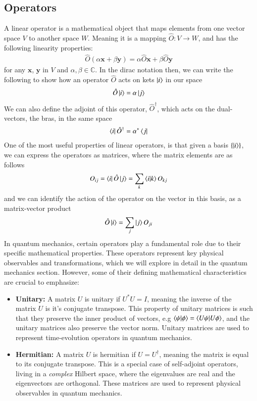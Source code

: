 \documentclass{subfiles}
\begin{document}
\subsection*{Operators}
A linear operator is a mathematical object that maps elements from one vector space $V$ to another space $W$. Meaning it is a mapping $\hat O: V \rightarrow W$, and has the following linearity properties:
\begin{align*}
    \hat O(\alpha \mathbf{x} + \beta\mathbf{y}) = \alpha \hat O\mathbf{x} + \beta \hat O\mathbf{y}
\end{align*}
for any $\mathbf{x}$, $\mathbf{y}$ in $V$ and $\alpha, \beta\in \mathbb{C}$. In the dirac notation then, we can write the following to show how an operator $\hat O$ acts on kets $\ket{i}$ in our space
\begin{align*}
    \hat O\ket{i} = \alpha \ket{j}
\end{align*}
We can also define the adjoint of this operator, $\hat O^\dagger$, which acts on the dual-vectors, the bras, in the same space
\begin{align*}
    \bra{i}\hat O^\dagger = \alpha^* \bra{j}
\end{align*}
One of the most useful properties of linear operators, is that given a basis $\{\ket{i}\}$, we can express the operators as matrices, where the matrix elements are as follows
\begin{align*}
    O_{ij} = \bra{i}\hat O\ket{j} = \sum_k\braket{i|k}O_{kj}
\end{align*}
and we can identify the action of the operator on the vector in this basis, as a matrix-vector product
\begin{align*}
    \hat O\ket{i} = \sum_j \ket{j}O_{ji}
\end{align*}
In quantum mechanics, certain operators play a fundamental role due to their specific mathematical properties. These operators represent key physical observables and transformations, which we will explore in detail in the quantum mechanics section. However, some of their defining mathematical characteristics are crucial to emphasize:
\begin{itemize}
    \item \textbf{Unitary:} A matrix $U$ is unitary if $U^*U = I$, meaning the inverse of the matrix $U$ is it's conjugate transpose. This property of unitary matrices is such that they preserve the inner product of vectors, e.g $\braket{\psi|\phi} = \braket{U\psi|U\phi}$, and the unitary matrices also preserve the vector norm. Unitary matrices are used to represent time-evolution operators in quantum mechanics.
    \item \textbf{Hermitian:} A matrix $U$ is hermitian if $U = U^\dagger$, meaning the matrix is equal to its conjugate transpose. This is a special case of self-adjoint operators, living in a \emph{complex} Hilbert space, where the eigenvalues are real and the eigenvectors are orthogonal. These matrices are used to represent physical observables in quantum mechanics.
\end{itemize}
\end{document}

